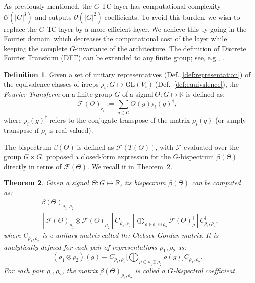 \documentclass{article}
\theoremstyle{plain}
\newtheorem{theorem}{Theorem}[section]
\theoremstyle{definition}
\newtheorem{definition}[theorem]{Definition}
\theoremstyle{remark}
\begin{document}
As previously mentioned, the $G$-TC layer has computational complexity $\mathcal{O}(|G|^3)$ and outputs $\mathcal{O}(|G|^2)$ coefficients. To avoid this burden, we wish to replace the $G$-TC layer by a more efficient layer. We achieve this by going in the Fourier domain, which decreases the computational cost of the layer while keeping the complete $G$-invariance of the architecture.
The definition of Discrete Fourier Transform (DFT) can be extended to any finite group; see, e.g., \cite{Diaconis1990EfficientCO}.
\begin{definition}
    Given a set of unitary representatives (Def.~\ref{def:representation}) of the equivalence classes of irreps $\rho_i:G\mapsto\mathrm{GL}(V_i)$ (Def.~\ref{def:equivalence}),
    the \emph{Fourier Transform} on a finite group $G$ of a signal $\Theta:G\mapsto\mathbb{R}$  is defined as:
    \begin{equation}
        \mathcal{F}(\Theta)_{\rho_i} :=\sum_{g\in G}\Theta(g)\rho_i(g)^\dagger,
    \end{equation}
     where $\rho_i(g)^\dagger$ refers to the conjugate transpose of the matrix $\rho_i(g)$  (or simply transpose if $\rho_i$ is real-valued).
\end{definition}
The bispectrum $\beta(\Theta)$ is defined as $\mathcal{F}(T(\Theta))$, with $\mathcal{F}$ evaluated over the group $G\times G$.
\citet{kakarala_thesis} proposed a closed-form expression for the $G$-bispectrum $\beta(\Theta)$ directly in terms of $\mathcal{F}(\Theta)$. We recall it in Theorem~\ref{def:bispectrum}.
\begin{theorem}{\cite{kakarala_finite_groups}}\label{def:bispectrum}
    Given a signal $\Theta:G\mapsto\mathbb{R}$, its bispectrum $\beta(\Theta)$ can be computed as:
    \begin{align*}
        &\beta(\Theta)_{\rho_1,\rho_2} =\\
        &\left[\mathcal{F}(\Theta)_{\rho_1}\otimes\mathcal{F}(\Theta)_{\rho_2}\right]C_{\rho_1,\rho_2}\left[\bigoplus_{\rho\in\rho_1\otimes\rho_2}\mathcal{F}(\Theta)_\rho^\dagger\right]C_{\rho_1,\rho_2}^{\dagger},
    \end{align*}
    where $C_{\rho_1,\rho_2}$ is a unitary matrix called the Clebsch-Gordan matrix. It is analytically defined for each pair of representations $\rho_1, \rho_2$ as:
    \begin{equation*}
        (\rho_1 \otimes \rho_2)(g) = C_{\rho_1,\rho_2} \Big[ \bigoplus_{\rho \in \rho_1 \otimes \rho_2} \rho(g) \Big] C_{\rho_1,\rho_2}^\dagger.
        \label{eqn:non-commutative-bs}
    \end{equation*}
    For each pair $\rho_1, \rho_2$, the matrix $\beta(\Theta)_{\rho_1, \rho_2}$ is called a $G$-bispectral coefficient.
\end{theorem}
\end{document}
